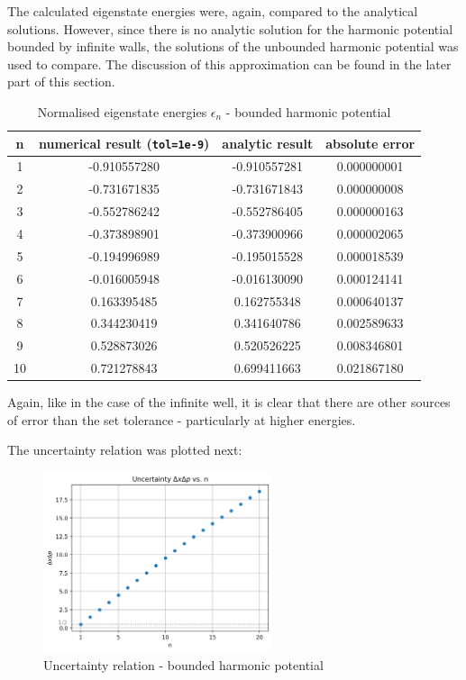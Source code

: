 \documentclass[11pt]{article}
\begin{document}
The calculated eigenstate energies were, again, compared to the analytical solutions.
However, since there is no analytic solution for the harmonic potential bounded by
infinite walls, the solutions of the unbounded harmonic potential was used to compare.
The discussion of this approximation can be found in the later part of this section.

\begin{table}[htbp]
  \centering
  \caption{Normalised eigenstate energies $\epsilon_n$ - bounded harmonic potential}
  \begin{tabular}{c|c|c|c}
    n & numerical result (\texttt{tol=1e-9}) & analytic result & absolute error\\
    \hline
    1 &-0.910557280&-0.910557281 & 0.000000001\\
    2 &-0.731671835&-0.731671843 & 0.000000008\\
    3 &-0.552786242&-0.552786405 & 0.000000163\\
    4 &-0.373898901&-0.373900966 & 0.000002065\\
    5 &-0.194996989&-0.195015528 & 0.000018539\\
    6 &-0.016005948&-0.016130090 & 0.000124141\\
    7 & 0.163395485& 0.162755348 & 0.000640137\\
    8 & 0.344230419& 0.341640786 & 0.002589633\\
    9 & 0.528873026& 0.520526225 & 0.008346801\\
    10& 0.721278843& 0.699411663 & 0.021867180
  \end{tabular}
  \label{tab:2}
\end{table}

Again, like in the case of the infinite well, it is clear that there are other
sources of error than the set tolerance - particularly at higher energies.

The uncertainty relation was plotted next:

\begin{figure}[h]
  \centering
  \includegraphics[width=0.6\textwidth]{uncertainty2.png}
  \caption{Uncertainty relation - bounded harmonic potential}
\end{figure}
\end{document}
